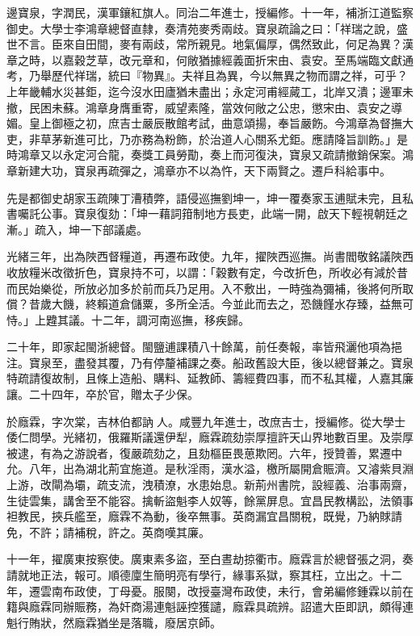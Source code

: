 \begin{pinyinscope}
邊寶泉，字潤民，漢軍鑲紅旗人。同治二年進士，授編修。十一年，補浙江道監察御史。大學士李鴻章總督直隸，奏清苑麥秀兩歧。寶泉疏論之曰：「祥瑞之說，盛世不言。臣來自田間，麥有兩歧，常所親見。地氣偏厚，偶然致此，何足為異？漢章之時，以嘉穀芝草，改元章和，何敞猶據經義面折宋由、袁安。至馬端臨文獻通考，乃舉歷代祥瑞，統曰『物異』。夫祥且為異，今以無異之物而謂之祥，可乎？上年畿輔水災甚鉅，迄今沒水田廬猶未盡出；永定河甫經蕆工，北岸又潰；邊軍未撤，民困未蘇。鴻章身膺重寄，威望素隆，當效何敞之公忠，懲宋由、袁安之導媚。皇上御極之初，庶吉士嚴辰散館考試，曲意頌揚，奉旨嚴飭。今鴻章為督撫大吏，非草茅新進可比，乃亦務為粉飾，於治道人心關系尤鉅。應請降旨訓飭。」是時鴻章又以永定河合龍，奏獎工員勞勩，奏上而河復決，寶泉又疏請撤銷保案。鴻章新建大功，寶泉再疏彈之，鴻章亦不以為忤，天下兩賢之。遷戶科給事中。

先是都御史胡家玉疏陳丁漕積弊，語侵巡撫劉坤一，坤一覆奏家玉逋賦未完，且私書囑託公事。寶泉復劾：「坤一藉詞箝制地方長吏，此端一開，啟天下輕視朝廷之漸。」疏入，坤一下部議處。

光緒三年，出為陜西督糧道，再遷布政使。九年，擢陜西巡撫。尚書閻敬銘議陜西收放糧米改徵折色，寶泉持不可，以謂：「穀數有定，今改折色，所收必有減於昔而民始樂從，所放必加多於前而兵乃足用。入不敷出，一時強為彌補，後將何所取償？昔歲大饑，終賴道倉儲粟，多所全活。今並此而去之，恐饑饉水存臻，益無可恃。」上韙其議。十二年，調河南巡撫，移疾歸。

二十年，即家起閩浙總督。閩鹽逋課積八十餘萬，前任奏報，率皆飛灑他項為挹注。寶泉至，盡發其覆，乃有停釐補課之奏。船政舊設大臣，後以總督兼之。寶泉特疏請復故制，且條上造船、購料、延教師、籌經費四事，而不私其權，人嘉其廉讓。二十四年，卒於官，贈太子少保。

於廕霖，字次棠，吉林伯都訥人。咸豐九年進士，改庶吉士，授編修。從大學士倭仁問學。光緒初，俄羅斯議還伊犁，廕霖疏劾崇厚擅許天山界地數百里。及崇厚被逮，有為之游說者，復嚴疏劾之，且劾樞臣畏葸欺罔。六年，授贊善，累遷中允。八年，出為湖北荊宜施道。是秋淫雨，漢水溢，檄所屬開倉賑濟。又濬紫貝淵上游，改閘為壩，疏支流，洩積潦，水患始息。新荊州書院，設經義、治事兩齋，生徒雲集，講舍至不能容。擒斬盜魁李人奴等，餘黨屏息。宜昌民教構訟，法領事袒教民，挾兵艦至，廕霖不為動，後卒無事。英商漏宜昌關稅，既覺，乃納賕請免，不許；請補稅，許之。英商嘆其廉。

十一年，擢廣東按察使。廣東素多盜，至白晝劫掠衢市。廕霖言於總督張之洞，奏請就地正法，報可。順德廩生簡明亮有學行，緣事系獄，察其枉，立出之。十二年，遷雲南布政使，丁母憂。服闋，改授臺灣布政使，未行，會弟編修鍾霖以前在籍與廕霖同辦賑務，為奸商湯連魁誣控獲譴，廕霖具疏辨。詔遣大臣即訊，頗得連魁行賄狀，然廕霖猶坐是落職，廢居京師。


\end{pinyinscope}
